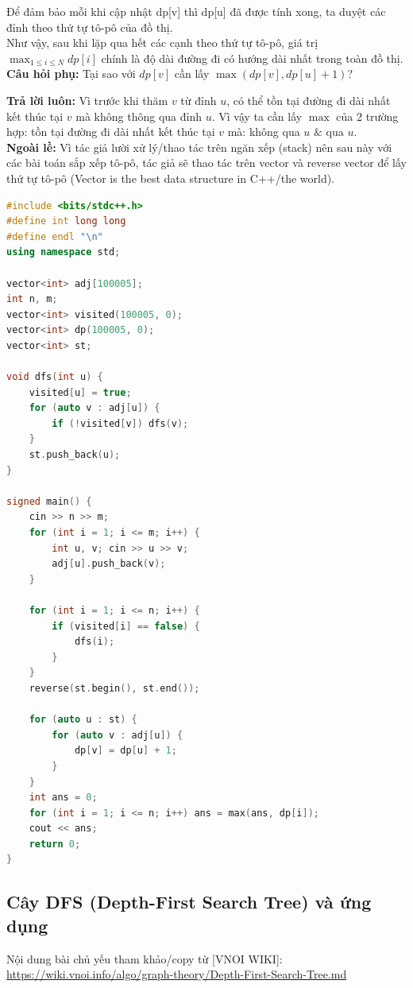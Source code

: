 \documentclass{article}
\begin{document}
Để đảm bảo mỗi khi cập nhật dp[v] thì dp[u] đã được tính xong, ta duyệt các đỉnh theo thứ tự tô-pô của đồ thị.\\

Như vậy, sau khi lặp qua hết các cạnh theo thứ tự tô-pô, giá trị $\max_{1 \leq i \leq N} dp[i]$ chính là độ dài đường đi có hướng dài nhất trong toàn đồ thị.\\

\textbf{Câu hỏi phụ:} Tại sao với $dp[v]$ cần lấy $\max(dp[v], dp[u] + 1)$?

\textbf{Trả lời luôn:} Vì trước khi thăm $v$ từ đỉnh $u$, có thể tồn tại đường đi dài nhất kết thúc tại $v$ mà không thông qua đỉnh $u$. Vì vậy ta cần lấy $\max$ của 2 trường hợp: tồn tại đường đi dài nhất kết thúc tại $v$ mà: không qua $u$ $\&$ qua $u$.\\

\textbf{Ngoài lề:} Vì tác giả lười xử lý/thao tác trên ngăn xếp (stack) nên sau này với các bài toán sắp xếp tô-pô, tác giả sẽ thao tác trên vector và reverse vector để lấy thứ tự tô-pô (Vector is the best data structure in C++/the world).

\begin{lstlisting}[language=C++, caption={Cài đặt}, label={code:CourseSchedule}]
#include <bits/stdc++.h>
#define int long long
#define endl "\n"
using namespace std;

vector<int> adj[100005];
int n, m; 
vector<int> visited(100005, 0);
vector<int> dp(100005, 0);
vector<int> st;

void dfs(int u) {
    visited[u] = true;
    for (auto v : adj[u]) {
        if (!visited[v]) dfs(v);
    }
    st.push_back(u);
}

signed main() {
    cin >> n >> m;
    for (int i = 1; i <= m; i++) {
        int u, v; cin >> u >> v;
        adj[u].push_back(v);
    }    

    for (int i = 1; i <= n; i++) {
        if (visited[i] == false) {
            dfs(i);
        }
    }
    reverse(st.begin(), st.end());

    for (auto u : st) {
        for (auto v : adj[u]) {
            dp[v] = dp[u] + 1;
        }
    }
    int ans = 0;
    for (int i = 1; i <= n; i++) ans = max(ans, dp[i]);
    cout << ans;
    return 0;
}
\end{lstlisting}

\subsection{Cây DFS (Depth-First Search Tree) và ứng dụng}
Nội dung bài chủ yếu tham khảo/copy từ [VNOI WIKI]: \url{https://wiki.vnoi.info/algo/graph-theory/Depth-First-Search-Tree.md}
\end{document}
